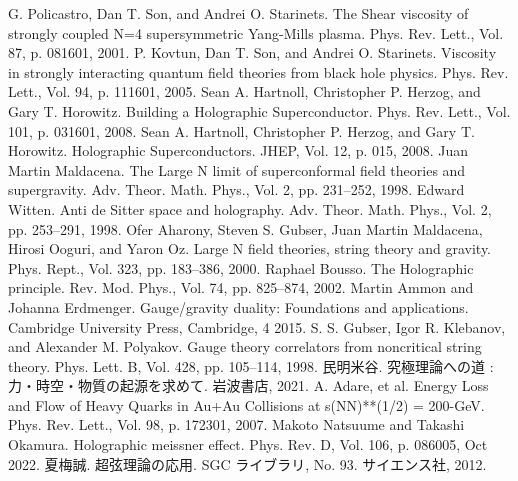 \documentclass[b5paper,11pt,dvipdfmx]{jsarticle}
\numberwithin{equation}{section}
\theoremstyle{definition}
\begin{document}
\begin{thebibliography}{99}
     G. Policastro, Dan T. Son, and Andrei O. Starinets. The Shear viscosity of strongly coupled N=4 supersymmetric Yang-Mills plasma. Phys. Rev. Lett., Vol. 87, p. 081601, 2001.
     P. Kovtun, Dan T. Son, and Andrei O. Starinets. Viscosity in strongly interacting quantum ﬁeld theories from black hole physics. Phys. Rev. Lett., Vol. 94, p. 111601, 2005.
     Sean A. Hartnoll, Christopher P. Herzog, and Gary T. Horowitz. Building a Holographic Superconductor. Phys. Rev. Lett., Vol. 101, p. 031601, 2008.
     Sean A. Hartnoll, Christopher P. Herzog, and Gary T. Horowitz. Holographic Superconductors. JHEP, Vol. 12, p. 015, 2008.
     Juan Martin Maldacena. The Large N limit of superconformal ﬁeld theories and supergravity. Adv. Theor. Math. Phys., Vol. 2, pp. 231–252, 1998.
     Edward Witten. Anti de Sitter space and holography. Adv. Theor. Math. Phys., Vol. 2, pp. 253–291, 1998.
     Ofer Aharony, Steven S. Gubser, Juan Martin Maldacena, Hirosi Ooguri, and Yaron Oz. Large N ﬁeld theories, string theory and gravity. Phys. Rept., Vol. 323, pp. 183–386, 2000.
     Raphael Bousso. The Holographic principle. Rev. Mod. Phys., Vol. 74, pp. 825–874, 2002.
     Martin Ammon and Johanna Erdmenger. Gauge/gravity duality: Foundations and applications. Cambridge University Press, Cambridge, 4 2015.
     S. S. Gubser, Igor R. Klebanov, and Alexander M. Polyakov. Gauge theory correlators from noncritical string theory. Phys. Lett. B, Vol. 428, pp. 105–114, 1998.
     民明米谷. 究極理論への道 : 力・時空・物質の起源を求めて. 岩波書店, 2021.
     A. Adare, et al. Energy Loss and Flow of Heavy Quarks in Au+Au Collisions at s(NN)**(1/2) = 200-GeV. Phys. Rev. Lett., Vol. 98, p. 172301, 2007.
     Makoto Natsuume and Takashi Okamura. Holographic meissner eﬀect. Phys. Rev. D, Vol. 106, p. 086005, Oct 2022.
     夏梅誠. 超弦理論の応用. SGC ライブラリ, No. 93. サイエンス社, 2012.
\end{thebibliography}
\end{document}
